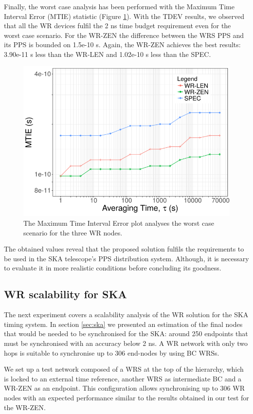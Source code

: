 Finally, the worst case analysis has been performed with the Maximum Time Interval Error (MTIE) statistic (Figure \ref{fig:mtie_exp1}). With the TDEV results, we observed that all the WR devices fulfil the 2 ns time budget requirement even for the worst case scenario. 
For the WR-ZEN the difference between the WRS PPS and its PPS is bounded on 1.5e-10 s. Again, the WR-ZEN achieves the best results: 3.90e-11 s less than the WR-LEN and 1.02e-10 s less than the SPEC.

\begin{figure}
	\centering
	\includegraphics[width=0.7\linewidth]{img/mtie_exp1}
	\caption[MTIE for the WR devices comparison.]{The Maximum Time Interval Error plot analyses the worst case scenario for the three WR nodes.}
	\label{fig:mtie_exp1}
\end{figure}

The obtained values reveal that the proposed solution fulfils the requirements 
to be used in the SKA telescope's PPS distribution system. Although, it is 
necessary to evaluate it in more realistic conditions before concluding its 
goodness.

\subsection{WR scalability for SKA}
\label{subsec: net_exp}

The next experiment covers a scalability analysis of the WR solution for the 
SKA timing system. In section \ref{sec:ska} we presented an estimation of the final nodes that would be needed to be synchronised for the SKA: around 250 endpoints that must be synchronised with an accuracy below 2 ns. A WR network with only two hops is suitable to synchronise up to 306 end-nodes by using BC WRSs.

We set up a test network composed of a WRS at the top of the hierarchy, which is locked to an external time reference, another WRS as intermediate BC and a WR-ZEN as an endpoint. This configuration allows synchronising up to 306 WR nodes with an expected performance similar to the results obtained in our test for the WR-ZEN.

